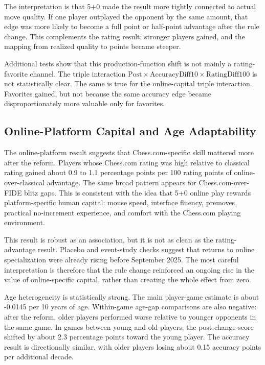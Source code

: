 The interpretation is that 5+0 made the result more tightly connected to actual move quality. If one player outplayed the opponent by the same amount, that edge was more likely to become a full point or half-point advantage after the rule change. This complements the rating result: stronger players gained, and the mapping from realized quality to points became steeper.

Additional tests show that this production-function shift is not mainly a rating-favorite channel. The triple interaction \(\text{Post} \times \text{AccuracyDiff10} \times \text{RatingDiff100}\) is not statistically clear. The same is true for the online-capital triple interaction. Favorites gained, but not because the same accuracy edge became disproportionately more valuable only for favorites.

\subsection{Online-Platform Capital and Age Adaptability}

The online-platform result suggests that Chess.com-specific skill mattered more after the reform. Players whose Chess.com rating was high relative to classical rating gained about 0.9 to 1.1 percentage points per 100 rating points of online-over-classical advantage. The same broad pattern appears for Chess.com-over-FIDE blitz gaps. This is consistent with the idea that 5+0 online play rewards platform-specific human capital: mouse speed, interface fluency, premoves, practical no-increment experience, and comfort with the Chess.com playing environment.

This result is robust as an association, but it is not as clean as the rating-advantage result. Placebo and event-study checks suggest that returns to online specialization were already rising before September 2025. The most careful interpretation is therefore that the rule change reinforced an ongoing rise in the value of online-specific capital, rather than creating the whole effect from zero.

Age heterogeneity is statistically strong. The main player-game estimate is about -0.0145 per 10 years of age. Within-game age-gap comparisons are also negative: after the reform, older players performed worse relative to younger opponents in the same game. In games between young and old players, the post-change score shifted by about 2.3 percentage points toward the young player. The accuracy result is directionally similar, with older players losing about 0.15 accuracy points per additional decade.

